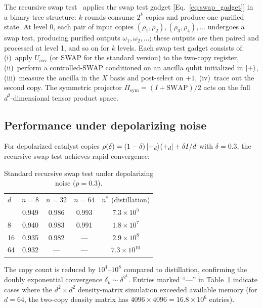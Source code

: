 \documentclass[prx,twocolumn,superscriptaddress,longbibliography,floatfix]{revtex4-2}
\begin{document}
The recursive swap test~\cite{Childs2025} applies the swap test gadget [Eq.~\eqref{eq:swap_gadget}] in a binary tree structure: $k$ rounds consume $2^k$ copies and produce one purified state.
At level 0, each pair of input copies $(\rho_1, \rho_2), (\rho_3, \rho_4), \ldots$ undergoes a swap test, producing purified outputs $\omega_1, \omega_2, \ldots$; these outputs are then paired and processed at level 1, and so on for $k$ levels.
Each swap test gadget consists of: (i)~apply $U_\mathrm{cov}$ (or SWAP for the standard version) to the two-copy register, (ii)~perform a controlled-SWAP conditioned on an ancilla qubit initialized in $\ket{+}$, (iii)~measure the ancilla in the $X$ basis and post-select on $+1$, (iv)~trace out the second copy.
The symmetric projector $\Pi_\mathrm{sym} = (I + \mathrm{SWAP})/2$ acts on the full $d^2$-dimensional tensor product space.

\subsection{Performance under depolarizing noise}
\label{sec:standard_depol}

For depolarized catalyst copies $\rho(\delta) = (1-\delta)\ket{+_d}\!\bra{+_d} + \delta I/d$ with $\delta = 0.3$, the recursive swap test achieves rapid convergence:

\begin{table}[tb]
\caption{Standard recursive swap test under depolarizing noise ($p = 0.3$).}
\label{tab:standard_depol}
\begin{ruledtabular}
\begin{tabular}{lcccc}
$d$ & $n = 8$ & $n = 32$ & $n = 64$ & $n^*$ (distillation) \\
\colrule
4 & 0.949 & 0.986 & 0.993 & $7.3 \times 10^5$ \\
8 & 0.940 & 0.983 & 0.991 & $1.8 \times 10^7$ \\
16 & 0.935 & 0.982 & --- & $2.9 \times 10^8$ \\
64 & 0.932 & --- & --- & $7.3 \times 10^{10}$ \\
\end{tabular}
\end{ruledtabular}
\end{table}

The copy count is reduced by $10^4$--$10^8$ compared to distillation, confirming the doubly exponential convergence $\delta_k \sim \delta^{2^k}$.
Entries marked ``---'' in Table~\ref{tab:standard_depol} indicate cases where the $d^2 \times d^2$ density-matrix simulation exceeded available memory (for $d = 64$, the two-copy density matrix has $4096 \times 4096 = 16.8 \times 10^6$ entries).
\end{document}
